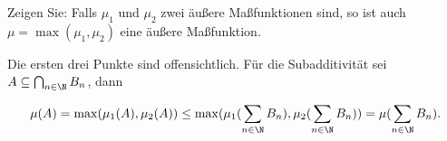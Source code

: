 \begin{exercise}

Zeigen Sie: Falls $\mu_1$ und $\mu_2$ zwei äußere Maßfunktionen sind, so ist auch $\mu = \max(\mu_1, \mu_2)$ eine äußere Maßfunktion.

\end{exercise}


\begin{solution}

Die ersten drei Punkte sind offensichtlich. Für die Subadditivität sei $A \subseteq \bigcap_{n \in \N} B_n$, dann

\begin{align*}
  \mu(A)
  =
  \max(\mu_1(A), \mu_2(A))
  \leq
  \max(\mu_1(\sum_{n \in \N} B_n), \mu_2(\sum_{n \in \N} B_n))
  =
  \mu(\sum_{n \in \N} B_n).
\end{align*}

\end{solution}
